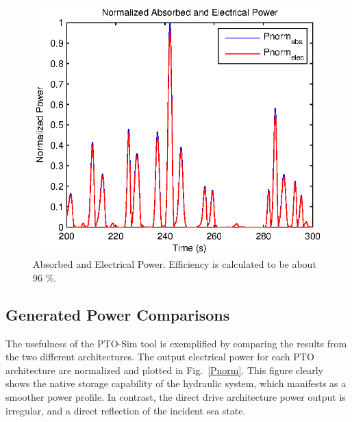 \documentclass[twocolumn,10pt]{asme2e}
\begin{document}
\begin{figure}[t]
    \centering
    \includegraphics[width=1\columnwidth]{Images/normDDPabsPelec}
    \caption{Absorbed and Electrical Power. Efficiency is calculated to be about 96 \%.}
    \label{DDP}
    \end{figure}
    
    
\subsection*{Generated Power Comparisons}

The usefulness of the PTO-Sim tool is exemplified by comparing the results from the two different architectures. The output electrical power for each PTO architecture are normalized and plotted in Fig.~\ref{Pnorm}. This figure clearly shows the native storage capability of the hydraulic system, which manifests as a smoother power profile. In contrast, the direct drive architecture power output is irregular, and a direct reflection of the incident sea state. 
\end{document}
